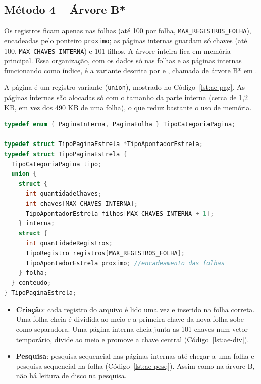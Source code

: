 \documentclass{article}
\begin{document}
\subsection{Método 4 -- Árvore B*}

Os registros ficam apenas nas folhas (até 100 por folha, \texttt{MAX\_REGISTROS\_FOLHA}), encadeadas pelo ponteiro \texttt{proximo}; as páginas internas guardam só chaves (até 100, \texttt{MAX\_CHAVES\_INTERNA}) e 101 filhos. A árvore inteira fica em memória principal. Essa organização, com os dados só nas folhas e as páginas internas funcionando como índice, é a variante descrita por \cite{comer1979} e \cite{knuth1998}, chamada de árvore B* em \cite{ziviani}.

A página é um registro variante (\texttt{union}), mostrado no Código~\ref{lst:ae-pag}. As páginas internas são alocadas só com o tamanho da parte interna (cerca de 1,2 KB, em vez dos 490 KB de uma folha), o que reduz bastante o uso de memória.

\begin{lstlisting}[caption={Página da árvore B* (aE.h).},label={lst:ae-pag},language=C]
typedef enum { PaginaInterna, PaginaFolha } TipoCategoriaPagina;

typedef struct TipoPaginaEstrela *TipoApontadorEstrela;
typedef struct TipoPaginaEstrela {
  TipoCategoriaPagina tipo;
  union {
    struct {
      int quantidadeChaves;
      int chaves[MAX_CHAVES_INTERNA];
      TipoApontadorEstrela filhos[MAX_CHAVES_INTERNA + 1];
    } interna;
    struct {
      int quantidadeRegistros;
      TipoRegistro registros[MAX_REGISTROS_FOLHA];
      TipoApontadorEstrela proximo; //encadeamento das folhas
    } folha;
  } conteudo;
} TipoPaginaEstrela;
\end{lstlisting}

\begin{itemize}
    \item \textbf{Criação}: cada registro do arquivo é lido uma vez e inserido na folha correta. Uma folha cheia é dividida ao meio e a primeira chave da nova folha sobe como separadora. Uma página interna cheia junta as 101 chaves num vetor temporário, divide ao meio e promove a chave central (Código~\ref{lst:ae-div}).
    \item \textbf{Pesquisa}: pesquisa sequencial nas páginas internas até chegar a uma folha e pesquisa sequencial na folha (Código~\ref{lst:ae-pesq}). Assim como na árvore B, não há leitura de disco na pesquisa.
\end{itemize}
\end{document}
